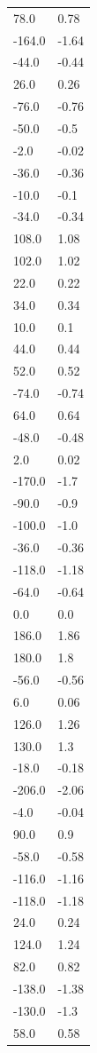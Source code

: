 \begin{longtable}{ll}
78.0 & 0.78 \\
-164.0 & -1.64 \\
-44.0 & -0.44 \\
26.0 & 0.26 \\
-76.0 & -0.76 \\
-50.0 & -0.5 \\
-2.0 & -0.02 \\
-36.0 & -0.36 \\
-10.0 & -0.1 \\
-34.0 & -0.34 \\
108.0 & 1.08 \\
102.0 & 1.02 \\
22.0 & 0.22 \\
34.0 & 0.34 \\
10.0 & 0.1 \\
44.0 & 0.44 \\
52.0 & 0.52 \\
-74.0 & -0.74 \\
64.0 & 0.64 \\
-48.0 & -0.48 \\
2.0 & 0.02 \\
-170.0 & -1.7 \\
-90.0 & -0.9 \\
-100.0 & -1.0 \\
-36.0 & -0.36 \\
-118.0 & -1.18 \\
-64.0 & -0.64 \\
0.0 & 0.0 \\
186.0 & 1.86 \\
180.0 & 1.8 \\
-56.0 & -0.56 \\
6.0 & 0.06 \\
126.0 & 1.26 \\
130.0 & 1.3 \\
-18.0 & -0.18 \\
-206.0 & -2.06 \\
-4.0 & -0.04 \\
90.0 & 0.9 \\
-58.0 & -0.58 \\
-116.0 & -1.16 \\
-118.0 & -1.18 \\
24.0 & 0.24 \\
124.0 & 1.24 \\
82.0 & 0.82 \\
-138.0 & -1.38 \\
-130.0 & -1.3 \\
58.0 & 0.58 \\

\end{longtable}
